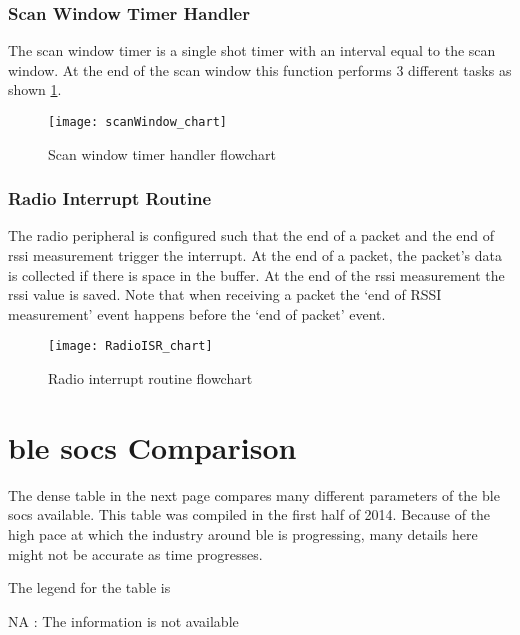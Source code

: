 \subsection{Scan Window Timer Handler}
The scan window timer is a single shot timer with an interval equal to the scan window. At the end of the scan window this function performs 3 different tasks as shown \ref{fig:scanWindow_chart}.
\begin{figure}[h]
\centering
\vspace{20pt}
\texttt{[image: scanWindow\_chart]}
\caption{Scan window timer handler flowchart}
\label{fig:scanWindow_chart}
\end{figure}
\clearpage

\subsection{Radio Interrupt Routine}
The radio peripheral is configured such that the end of a packet and the end of \acrshort{rssi} measurement trigger the interrupt. At the end of a packet, the packet's data is collected if there is space in the buffer. At the end of the \acrshort{rssi} measurement the \acrshort{rssi} value is saved. Note that when receiving a packet the `end of RSSI measurement' event happens before the `end of packet' event. 

\begin{figure}[h]
\centering
\vspace{-10pt}
\texttt{[image: RadioISR\_chart]}
\caption{Radio interrupt routine flowchart}
\label{fig:RadioISR_chart}
\vspace{-10pt}
\end{figure}

\chapter{\texorpdfstring{\gls{ble}}{BLE} \texorpdfstring{\glspl{soc}}{SoCs} Comparison} \label{ApdxSoC}
The dense table in the next page compares many different parameters of the \gls{ble} \glspl{soc} available. This table was compiled in the first half of 2014. Because of the high pace at which the industry around \gls{ble} is progressing, many details here might not be accurate as time progresses.

The legend for the table is

\vspace{10pt}
NA \hspace{10pt}: The information is not available

